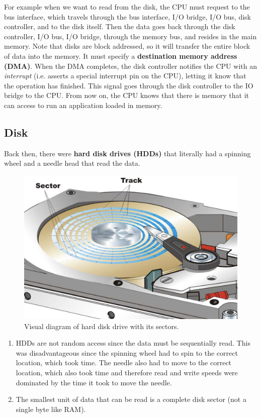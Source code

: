   For example when we want to read from the disk, the CPU must request to the bus interface, which travels through the bus interface, I/O bridge, I/O bus, disk controller, and to the disk itself. Then the data goes back through the disk controller, I/O bus, I/O bridge, through the memory bus, and resides in the main memory. Note that disks are block addressed, so it will transfer the entire block of data into the memory. It must specify a \textbf{destination memory address (DMA)}. When the DMA completes, the disk controller notifies the CPU with an \textit{interrupt} (i.e. asserts a special interrupt pin on the CPU), letting it know that the operation has finished. This signal goes through the disk controller to the IO bridge to the CPU. From now on, the CPU knows that there is memory that it can access to run an application loaded in memory. 

\subsection{Disk} 

  \begin{definition}
    Back then, there were \textbf{hard disk drives (HDDs)} that literally had a spinning wheel and a needle head that read the data. 
    \begin{figure}[H]
      \centering 
      \includegraphics[scale=0.4]{img/hdd.png}
      \caption{Visual diagram of hard disk drive with its sectors. } 
      \label{fig:hdd}
    \end{figure}
    \begin{enumerate}
      \item HDDs are not random access since the data must be sequentially read. This was disadvantageous since the spinning wheel had to spin to the correct location, which took time. The needle also had to move to the correct location, which also took time and therefore read and write speeds were dominated by the time it took to move the needle.
      \item The smallest unit of data that can be read is a complete disk sector (not a single byte like RAM). 
    \end{enumerate}
  \end{definition}

